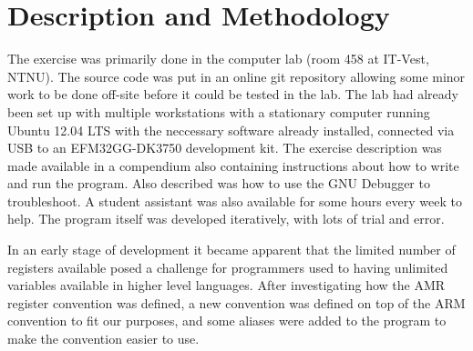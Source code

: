 \chapter{Description and Methodology}
The exercise was primarily done in the computer lab (room 458 at IT-Vest, NTNU). The source code was put in an online git repository allowing some minor work to be done off-site before it could be tested in the lab.
The lab had already been set up with multiple workstations with a stationary computer running Ubuntu 12.04 LTS with the neccessary software already installed, connected via USB to an EFM32GG-DK3750 development kit.
The exercise description was made available in a compendium also containing instructions about how to write and run the program. Also described was how to use the GNU Debugger to troubleshoot. A student assistant was also available for some hours every week to help.
The program itself was developed iteratively, with lots of trial and error.

In an early stage of development it became apparent that the limited number of registers available posed a challenge for programmers used to having unlimited variables available in higher level languages.
After investigating how the AMR register convention was defined, a new convention was defined on top of the ARM convention to fit our purposes, and some aliases were added to the program to make the convention easier to use.

